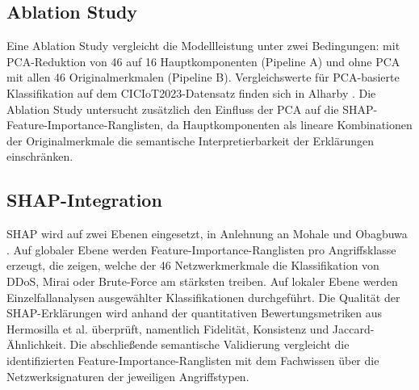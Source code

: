 \subsection{Ablation Study}

Eine Ablation Study vergleicht die Modellleistung unter zwei Bedingungen: mit PCA-Reduktion von 46 auf 16 Hauptkomponenten (Pipeline A) und ohne PCA mit allen 46 Originalmerkmalen (Pipeline B). Vergleichswerte für PCA-basierte Klassifikation auf dem CICIoT2023-Datensatz finden sich in Alharby \cite{alharby2025ciciot}. Die Ablation Study untersucht zusätzlich den Einfluss der PCA auf die SHAP-Feature-Importance-Ranglisten, da Hauptkomponenten als lineare Kombinationen der Originalmerkmale die semantische Interpretierbarkeit der Erklärungen einschränken.

\subsection{SHAP-Integration}

SHAP wird auf zwei Ebenen eingesetzt, in Anlehnung an Mohale und Obagbuwa \cite{mohale2025xai}. Auf globaler Ebene werden Feature-Importance-Ranglisten pro Angriffsklasse erzeugt, die zeigen, welche der 46 Netzwerkmerkmale die Klassifikation von DDoS, Mirai oder Brute-Force am stärksten treiben. Auf lokaler Ebene werden Einzelfallanalysen ausgewählter Klassifikationen durchgeführt. Die Qualität der SHAP-Erklärungen wird anhand der quantitativen Bewertungsmetriken aus Hermosilla et al. \cite{hermosilla2025xai_forensic} überprüft, namentlich Fidelität, Konsistenz und Jaccard-Ähnlichkeit. Die abschließende semantische Validierung vergleicht die identifizierten Feature-Importance-Ranglisten mit dem Fachwissen über die Netzwerksignaturen der jeweiligen Angriffstypen.

